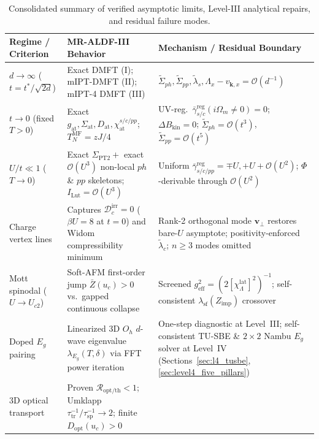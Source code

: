 \documentclass[11pt,a4paper]{article}
\numberwithin{equation}{section}
\theoremstyle{plain}
\theoremstyle{definition}
\providecommand{\vk}{\mathbf{k}}
\begin{document}
\begin{table}[htbp]
\centering
\renewcommand{\arraystretch}{1.20}
\caption{Consolidated summary of verified asymptotic limits, Level-III analytical repairs, and residual failure modes.}
\label{tab:diagnostics}
\vspace{0.4em}
\small
\begin{tabular}{p{3.2cm}p{5.3cm}p{5.8cm}}
\hline\hline
\textbf{Regime / Criterion} & \textbf{MR-ALDF-III Behavior} & \textbf{Mechanism / Residual Boundary} \\
\hline
$d \to \infty$ ($t = t^*/\sqrt{2d}$)
    & Exact DMFT (I); mIPT-DMFT (II); mIPT-4 DMFT (III)
    & $\tilde{\Sigma}_{ph}, \tilde{\Sigma}_{pp}, \tilde{\lambda}_s, \Lambda_x - v_{\vk,x} = \mathcal{O}(d^{-1})$ \\
$t \to 0$ (fixed $T > 0$)
    & Exact $g_{\mathrm{at}}, \Sigma_{\mathrm{at}}, D_{\mathrm{at}}, \chi_{\mathrm{at}}^{s/c/pp}$; $T_N^{\mathrm{MF}} = zJ/4$
    & UV-reg.\ $\bar{\gamma}_{s/c}^{\mathrm{reg}}(i\Omega_m \neq 0) = 0$; $\Delta B_{\mathrm{kin}} = 0$; $\tilde{\Sigma}_{ph} = \mathcal{O}(t^3)$, $\tilde{\Sigma}_{pp} = \mathcal{O}(t^5)$ \\
$U/t \ll 1$ ($T \to 0$)
    & Exact $\Sigma_{\mathrm{PT2}} +$ exact $\mathcal{O}(U^3)$ non-local $ph$ \& $pp$ skeletons; $I_{\mathrm{Lut}} = \mathcal{O}(U^3)$
    & Uniform $\bar{\gamma}_{s/c/pp}^{\mathrm{reg}} = \mp U, +U + \mathcal{O}(U^2)$; $\Phi$-derivable through $\mathcal{O}(U^2)$ \\
Charge vertex lines
    & Captures $\mathcal{D}_c^{\mathrm{irr}} = 0$ ($\beta U = 8$ at $t=0$) and Widom compressibility minimum
    & Rank-2 orthogonal mode $\mathbf{v}_\perp$ restores bare-$U$ asymptote; positivity-enforced $\tilde{\lambda}_c$; $n \ge 3$ modes omitted \\
Mott spinodal ($U \to U_{c2}$)
    & Soft-AFM first-order jump $\bar{Z}(u_c) > 0$ vs.\ gapped continuous collapse
    & Screened $g_{\mathrm{eff}}^2 = (2[\chi_\Lambda^{\mathrm{lat}}]^2)^{-1}$; self-consistent $\lambda_{\mathrm{sf}}(Z_{\mathrm{imp}})$ crossover \\
Doped $E_g$ pairing
    & Linearized 3D $O_h$ $d$-wave eigenvalue $\lambda_{E_g}(T,\delta)$ via FFT power iteration
    & One-step diagnostic at Level~III; self-consistent TU-SBE \& $2\times 2$ Nambu $E_g$ solver at Level~IV (Sections~\ref{sec:l4_tusbe}, \ref{sec:level4_five_pillars}) \\
3D optical transport
    & Proven $\mathcal{R}_{\mathrm{opt/th}} < 1$; Umklapp $\tau_{\mathrm{tr}}^{-1}/\tau_{\mathrm{sp}}^{-1} \to 2$; finite $D_{\mathrm{opt}}(u_c) > 0$

\end{tabular}
\end{table}
\end{document}
